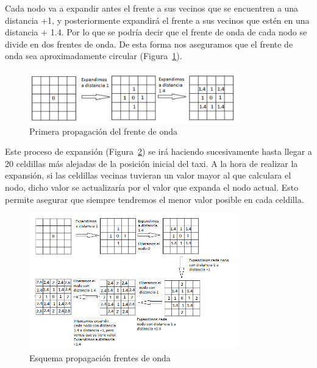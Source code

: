 Cada nodo va a expandir antes el frente a sus vecinos que se encuentren a una distancia +1, y posteriormente expandirá el frente a sus vecinos que estén en una distancia + 1.4. Por lo que se podría decir que el frente de onda de cada nodo se divide en dos frentes de onda. De esta forma nos aseguramos que el frente de onda sea aproximadamente circular (Figura~\ref{fig.primera_expansion_gpp}).

\begin{figure}[H]
  \begin{center}
    \includegraphics[width=0.8\textwidth]{figures/GPP/primera_expansion.png}
		\caption{Primera propagación del frente de onda}
		\label{fig.primera_expansion_gpp}
		\end{center}
\end{figure}

Este proceso de expansión (Figura~\ref{fig.algoritmo_expansion_gpp}) se irá haciendo sucesivamente hasta llegar a 20 celdillas más alejadas de la posición inicial del taxi. A la hora de realizar la expansión, si las celdillas vecinas tuvieran un valor mayor al que calculara el nodo, dicho valor se actualizaría por el valor que expanda el nodo actual. Esto permite asegurar que siempre tendremos el menor valor posible en cada celdilla.\\

\begin{figure}[H]
  \begin{center}
    \includegraphics[width=0.8\textwidth]{figures/GPP/algoritmo_expansion.png}
		\caption{Esquema propagación frentes de onda}
		\label{fig.algoritmo_expansion_gpp}
		\end{center}
\end{figure}


